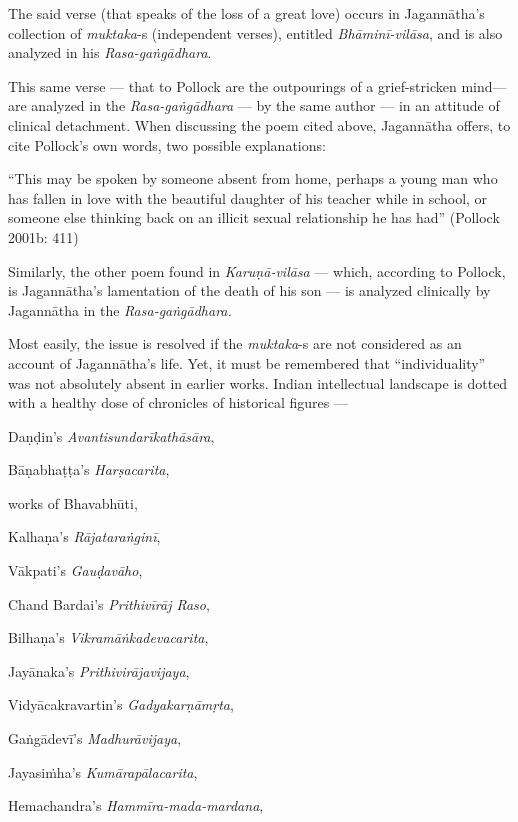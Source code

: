 The said verse (that speaks of the loss of a great love) occurs in Jagannātha’s collection of {\sl muktaka}-s (independent verses), entitled {\sl Bhāminī-vilāsa}, and is also analyzed in his {\sl Rasa-gaṅgādhara}. 

This same verse — that to Pollock are the outpourings of a grief-stricken mind— are analyzed in the {\sl Rasa-gaṅgādhara} — by the same author — in an attitude of clinical detachment. When discussing the poem cited above, Jagannātha offers, to cite Pollock’s own words, two possible explanations: 

\begin{myquote}
“This may be spoken by someone absent from home, perhaps a young man who has fallen in love with the beautiful daughter of his teacher while in school, or someone else thinking back on an illicit sexual relationship he has had” 
\hfill (Pollock 2001b: 411) 
\end{myquote}

Similarly, the other poem found in {\sl Karuṇā-vilāsa} — which, according to Pollock, is Jagannātha’s lamentation of the death of his son — is analyzed clinically by Jagannātha in the {\sl Rasa-gaṅgādhara.}

Most easily, the issue is resolved if the {\sl muktaka}-s are not considered as an account of Jagannātha’s life. Yet, it must be remembered that “individuality” was not absolutely absent in earlier works. Indian intellectual landscape is dotted with a healthy dose of chronicles of historical figures — 

Daṇḍin’s {\sl Avantisundarīkathāsāra}, 

Bāṇabhaṭṭa’s {\sl Harṣacarita},

works of Bhavabhūti, 

Kalhaṇa’s {\sl Rājataraṅginī}, 

Vākpati’s {\sl Gauḍavāho}, 

Chand Bardai’s {\sl Prithivīrāj Raso}, 

Bilhaṇa’s {\sl Vikramāṅkadevacarita}, 

Jayānaka’s {\sl Prithivirājavijaya}, 

Vidyācakravartin’s {\sl Gadyakarṇāmṛta}, 

Gaṅgā\-devī’s {\sl Madhurāvijaya}, 

Jayasiṁha’s {\sl Kumārapālacarita}, 

Hemachandra’s {\sl Hammīra-mada-mardana}, 

